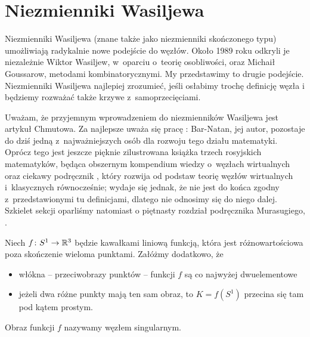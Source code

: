 \section{Niezmienniki Wasiljewa} %
\label{sec:vassiliev}
Niezmienniki Wasiljewa (znane także jako niezmienniki skończonego typu) umożliwiają radykalnie nowe podejście do węzłów.
Około 1989 roku odkryli je niezależnie Wiktor Wasiljew, w~oparciu o~teorię osobliwości, oraz Michaił Goussarow, metodami kombinatorycznymi.
My przedstawimy to drugie podejście.
Niezmienniki Wasiljewa najlepiej zrozumieć, jeśli osłabimy trochę definicję węzła i będziemy rozważać także krzywe z~samoprzecięciami.

Uważam, że przyjemnym wprowadzeniem do niezmienników Wasiljewa jest artykuł \cite{chmutov12} Chmutowa.
Za najlepsze uważa się pracę \cite{barnatan_95}: Bar-Natan, jej autor, pozostaje do dziś jedną z~najważniejszych osób dla rozwoju tego działu matematyki.
Oprócz tego jest jeszcze pięknie zilustrowana książka \cite{duzhin12} trzech rosyjskich matematyków, będąca obszernym kompendium wiedzy o~węzłach wirtualnych oraz ciekawy podręcznik \cite{dye16}, który rozwija od podstaw teorię węzłów wirtualnych i~klasycznych równocześnie; wydaje się jednak, że nie jest do końca zgodny z~przedstawionymi tu definicjami, dlatego nie odnosimy się do niego dalej.
Szkielet sekcji oparliśmy natomiast o piętnasty rozdział podręcznika Murasugiego, \cite{murasugi96}.

\begin{definition}
%
    Niech $f \colon S^1 \to \mathbb R^3$ będzie kawałkami liniową funkcją, która jest różnowartościowa poza skończenie wieloma punktami.
    Załóżmy dodatkowo, że
    \begin{itemize}
        \item włókna -- przeciwobrazy punktów -- funkcji $f$ są co najwyżej dwuelementowe
        \item jeżeli dwa różne punkty mają ten sam obraz, to $K = f(S^1)$ przecina się tam pod kątem prostym.
    \end{itemize}
    Obraz funkcji $f$ nazywamy węzłem singularnym.
\end{definition}

